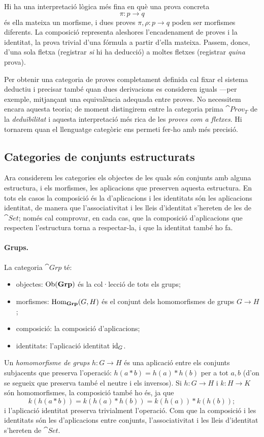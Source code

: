 \begin{observacio}
Hi ha una interpretació lògica més fina en què una prova concreta
\[
\pi\colon p\longrightarrow q
\]
és ella mateixa un morfisme, i dues proves $\pi,\rho\colon p\to q$ poden ser morfismes diferents. La composició representa aleshores l'encadenament de proves i la identitat, la prova trivial d'una fórmula a partir d'ella mateixa. Passem, doncs, d'una sola fletxa (registrar \emph{si} hi ha deducció) a moltes fletxes (registrar \emph{quina} prova).

Per obtenir una categoria de proves completament definida cal fixar el sistema deductiu i precisar també quan dues derivacions es consideren iguals ---per exemple, mitjançant una equivalència adequada entre proves. No necessitem encara aquesta teoria; de moment distingirem entre la categoria prima $\cat{Prov}_T$ de la \emph{deduïbilitat} i aquesta interpretació més rica de les \emph{proves com a fletxes}. Hi tornarem quan el llenguatge categòric ens permeti fer-ho amb més precisió.
\end{observacio}

\subsection{Categories de conjunts estructurats}

Ara considerem les categories els objectes de les quals són conjunts amb alguna estructura, i els morfismes, les aplicacions que preserven aquesta estructura. En tots els casos la composició és la d'aplicacions i les identitats són les aplicacions identitat, de manera que l'associativitat i les lleis d'identitat s'hereten de les de $\cat{Set}$; només cal comprovar, en cada cas, que la composició d'aplicacions que respecten l'estructura torna a respectar-la, i que la identitat també ho fa.

\paragraph{Grups.}
La categoria $\cat{Grp}$ té:
\begin{itemize}
\item objectes: $\operatorname{Ob}(\mathbf{Grp})$ és la col·lecció de tots els grups;
\item morfismes: $\operatorname{Hom}_{\mathbf{Grp}}(G,H)$ és el conjunt dels homomorfismes de grups $G\to H$;
\item composició: la composició d'aplicacions;
\item identitats: l'aplicació identitat $\operatorname{id}_{G}$.
\end{itemize}
Un \emph{homomorfisme de grups} $h\colon G\to H$ és una aplicació entre els conjunts subjacents que preserva l'operació: $h(a\ast b)=h(a)\ast h(b)$ per a tot $a,b$ (d'on se segueix que preserva també el neutre i els inversos). Si $h\colon G\to H$ i $k\colon H\to K$ són homomorfismes, la composició també ho és, ja que
\[
k(h(a\ast b))=k(h(a)\ast h(b))=k(h(a))\ast k(h(b));
\]
i l'aplicació identitat preserva trivialment l'operació. Com que la composició i les identitats són les d'aplicacions entre conjunts, l'associativitat i les lleis d'identitat s'hereten de $\cat{Set}$.

